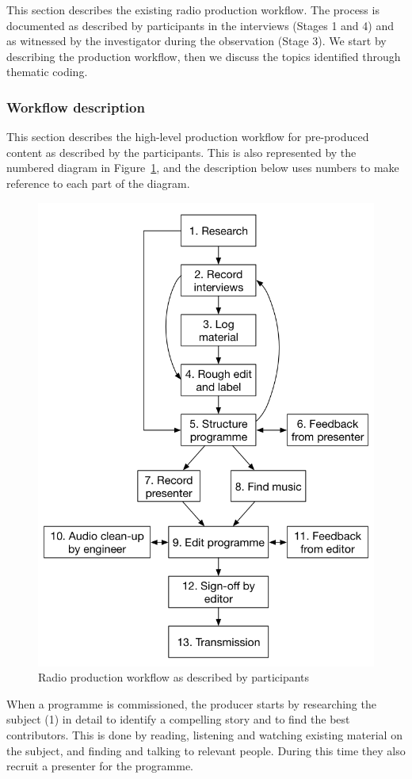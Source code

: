 
This section describes the existing radio production workflow. The process is documented as described by participants
in the interviews (Stages 1 and 4) and as witnessed by the investigator during the observation (Stage 3).  We start by
describing the production workflow, then we discuss the topics identified through thematic coding.

\subsubsection{Workflow description}

This section describes the high-level production workflow for pre-produced content as described by the
participants. This is also represented by the numbered diagram in Figure~\ref{fig:workflow}, and the description below
uses numbers to make reference to each part of the diagram.

\begin{figure}[ht]
\centering
  \includegraphics[width=.6\columnwidth]{figs/workflow.png}
  \caption{Radio production workflow as described by participants}
  \label{fig:workflow}
\end{figure}

When a programme is commissioned, the producer starts by researching the
subject (1) in detail to identify a compelling story and to find the best
contributors. This is done by reading, listening and watching existing material
on the subject, and finding and talking to relevant people. During this time
they also recruit a presenter for the programme.

